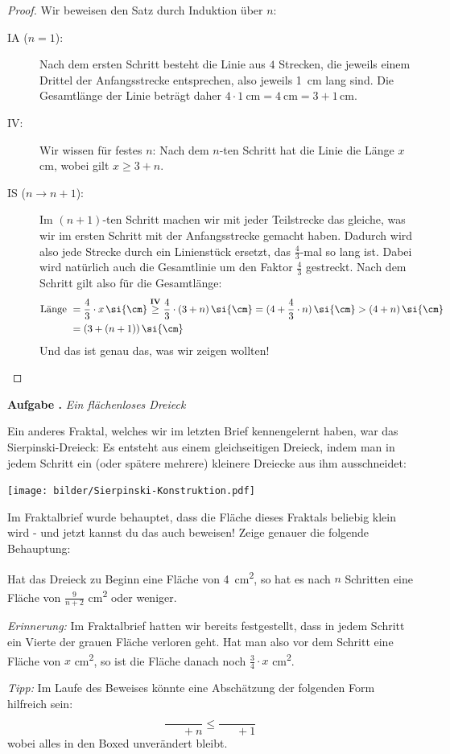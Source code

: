 \documentclass[a4paper,ngerman,12pt]{scrartcl}
\theoremstyle{definition}
\theoremstyle{plain}
\theoremstyle{remark}
\newlength{\aufgabenskip}
\newcounter{aufgabennummer}
\newenvironment{aufgabe}[1]{
	\refstepcounter{aufgabennummer}
	\textbf{Aufgabe \theaufgabennummer.} \emph{#1} \par
}{\vspace{\aufgabenskip}}
\begin{document}
\begin{proof}
	Wir beweisen den Satz durch Induktion über $n$:
	\begin{description}
		\item[IA ($n=1$):] Nach dem ersten Schritt besteht die Linie aus $4$ Strecken, die jeweils einem Drittel der Anfangsstrecke entsprechen, also jeweils \SI{1}{\cm} lang sind. Die Gesamtlänge der Linie beträgt daher $4 \cdot \SI{1}{\cm} = \SI{4}{\cm} = 3+1\,\si{\cm}$.
		\item[IV:] Wir wissen für festes $n$: Nach dem $n$-ten Schritt hat die Linie die Länge $x$ \si{\cm}, wobei gilt $x \geq 3+n$.
		\item[IS ($n\to n+1$):] Im $(n+1)$-ten Schritt machen wir mit jeder Teilstrecke das gleiche, was wir im ersten Schritt mit der Anfangsstrecke gemacht haben. Dadurch wird also jede Strecke durch ein Linienstück ersetzt, das $\frac{4}{3}$-mal so lang ist. Dabei wird natürlich auch die Gesamtlinie um den Faktor $\frac{4}{3}$ gestreckt. Nach dem Schritt gilt also für die Gesamtlänge:
			\begin{align*}
			\text{Länge } 	&= \frac{4}{3}\cdot x\,\si{\cm} \overset{\text{\textbf{IV}}}{\geq} \frac{4}{3}\cdot (3+n)\,\si{\cm} = (4+\frac{4}{3}\cdot n)\,\si{\cm} > (4+ n)\,\si{\cm} \\
							&= (3+ (n+1))\,\si{\cm}
			\end{align*}
		Und das ist genau das, was wir zeigen wollten!
	\end{description}
\end{proof}

\begin{aufgabe}{Ein flächenloses Dreieck}
	Ein anderes Fraktal, welches wir im letzten Brief kennengelernt haben, war das Sierpinski-Dreieck: Es entsteht aus einem gleichseitigen Dreieck, indem man in jedem Schritt ein (oder spätere mehrere) kleinere Dreiecke aus ihm ausschneidet:
	\begin{center}
		\texttt{[image: bilder/Sierpinski-Konstruktion.pdf]}
	\end{center}
	Im Fraktalbrief wurde behauptet, dass die Fläche dieses Fraktals beliebig klein wird - und jetzt kannst du das auch beweisen! Zeige genauer die folgende Behauptung:
	\begin{center}
		Hat das Dreieck zu Beginn eine Fläche von \SI{4}{\cm\squared}, so hat es nach $n$ Schritten eine Fläche von $\frac{9}{n+2}$ \si{\cm\squared} oder weniger.
	\end{center}
	\emph{Erinnerung:} Im Fraktalbrief hatten wir bereits festgestellt, dass in jedem Schritt ein Vierte der grauen Fläche verloren geht. Hat man also vor dem Schritt eine Fläche von $x$ \si{\cm\squared}, so ist die Fläche danach noch $\frac{3}{4}\cdot x$ \si{\cm\squared}.
	
	\emph{Tipp:} Im Laufe des Beweises könnte eine Abschätzung der folgenden Form hilfreich sein: 
		\[\frac{\boxed{\phantom{123}}}{\boxed{\phantom{123}} + n} \leq \frac{\boxed{\phantom{123}}}{\boxed{\phantom{123}} + 1} \]
	wobei alles in den Boxed unverändert bleibt.
\end{aufgabe}
\end{document}
